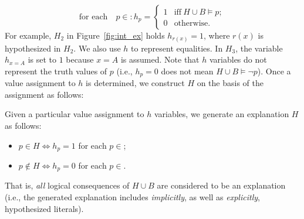 \documentclass[english]{jnlp_1.4}
\def\leader#1{}
\def\P{}
\begin{document}
\leader{To represent whether the literal or equality $p \in \P$ is
  hypothesized (including \emph{implicitly} hypothesized), we
  introduce an ILP variable $h \in \{0, 1\}$ as follows:}
\[
\text{for each}\quad p \in \P: h_p = \begin{cases}
  1 & \text{iff}\ H \cup B \models p; \\
  0 & \text{otherwise.}
\end{cases}
\]
For example, $H_2$ in Figure~\ref{fig:int_ex} holds $h_{r(x)}=1$,
where $r(x)$ is hypothesized in $H_2$. We also use $h$ to represent
equalities. 
In $H_3$, the variable $h_{x=A}$ is set to $1$ because $x=A$ is
assumed.  Note that $h$ variables do not represent the truth values
of $p$ (i.e., $h_p=0$ does not mean $H \cup B \models \lnot p$). Once a
value assignment to $h$ is determined, we construct $H$ on the basis of the
assignment as follows:
\begin{mydef}
\label{def:relsolhypo}
Given a particular value assignment to $h$ variables, we generate an
explanation $H$ as follows:
\begin{itemize}
\item $p \in H \Leftrightarrow h_p=1$ for each $p \in \P$;
\item $p \not\in H \Leftrightarrow h_p=0$ for each $p \in \P$.
\end{itemize}
\end{mydef}
That is, \emph{all} logical consequences of $H \cup B$ are considered
to be an explanation (i.e., the generated explanation includes
\emph{implicitly}, as well as \emph{explicitly},
hypothesized literals).  
\end{document}
